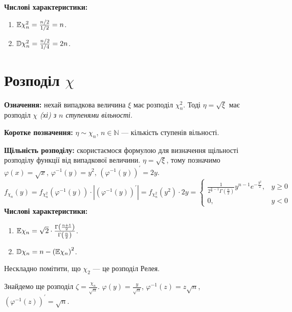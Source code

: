 \noindent\textbf{Числові характеристики:}
\begin{enumerate}
    \item $\mathbb{E}\chi_n^2 = \frac{n/2}{1/2} = n$.
    \item $\mathbb{D}\chi_n^2 = \frac{n/2}{1/4} = 2n$.
\end{enumerate}

\section{Розподіл \texorpdfstring{$\chi$}{x}}
\noindent\textbf{Означення:} нехай випадкова величина $\xi$ має розподіл $\chi_n^2$.
Тоді $\eta = \sqrt{\xi}$ має розподіл
\emph{$\chi$ (хі) з $n$ ступенями вільності}.

\noindent\textbf{Коротке позначення:} $\eta \sim \chi_n$, $n\in\mathbb{N}$ --- кількість ступенів вільності.

\noindent\textbf{Щільність розподілу:} скористаємося формулою для визначення щільності розподілу функції від
випадкової величини. $\eta = \sqrt{\xi}$, тому позначимо $\varphi(x) = \sqrt{x}$, $\varphi^{-1}(y) = y^2$,
$\left( \varphi^{-1}(y) \right)^{\prime} = 2y$.
\begin{equation*}
    f_{\chi_n}(y) = f_{\chi_n^2}\left(\varphi^{-1} (y)\right) \cdot \left|\left(\varphi^{-1} (y) \right)^{\prime}\right| =
f_{\chi_n^2}(y^2) \cdot 2y = 
\begin{cases}
    \frac{1}{2^{\frac{n}{2} - 1} \Gamma\left(\frac{n}{2}\right)} y^{n-1} e^{-\frac{y^2}{2}}, & y \geq 0 \\
    0, & y < 0
\end{cases}
\end{equation*}
\noindent\textbf{Числові характеристики:}
\begin{enumerate}
    \item $\mathbb{E}\chi_n = \sqrt{2} \cdot \frac{\Gamma\left(\frac{n+1}{2}\right)}{\Gamma\left(\frac{n}{2}\right)}$.
    \item $\mathbb{D}\chi_n = n - \left( \mathbb{E}\chi_n \right)^2$.
\end{enumerate}

\begin{remark}
    Нескладно помітити, що $\chi_2$ --- це розподіл Релея.
\end{remark} 

\noindent Знайдемо ще розподіл $\zeta = \frac{\chi_n}{\sqrt{n}}$. $\varphi(y) = \frac{y}{\sqrt{n}}$,
$\varphi^{-1}(z) = z \sqrt{n}$, 
$\left( \varphi^{-1}(z) \right)^{\prime} = \sqrt{n}$.

